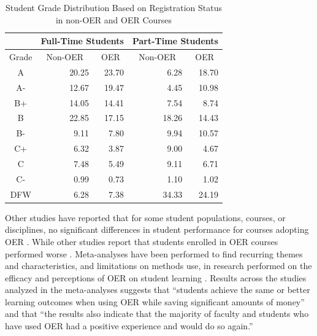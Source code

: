 \documentclass[11pt]{article}
\begin{document}
\begin{table}
\centering
\begin{tabular}{crrrr}
  & \multicolumn{2}{c}{Full-Time Students} & \multicolumn{2}{c}{Part-Time Students} \\ \hline
  \multicolumn{1}{c}{Grade} & \multicolumn{1}{c}{Non-OER} & \multicolumn{1}{c}{OER} & \multicolumn{1}{c}{Non-OER} & \multicolumn{1}{c}{OER}\\ \hline
  A\hspace{1.1ex} & 20.25 & 23.70 & 6.28 & 18.70 \\
  A-\hspace{0.7ex} & 12.67 & 19.47 & 4.45 & 10.98 \\
  B+ & 14.05 & 14.41 & 7.54 & 8.74 \\
  B\hspace{1.1ex} & 22.85 & 17.15 & 18.26 & 14.43 \\
  B-\hspace{0.7ex} & 9.11 & 7.80 & 9.94 & 10.57 \\
  C+ & 6.32 & 3.87 & 9.00 & 4.67 \\
  C\hspace{1.1ex} & 7.48 & 5.49 & 9.11 & 6.71 \\
  C-\hspace{0.8ex} & 0.99 & 0.73 & 1.10 & 1.02 \\
  DFW & 6.28 & 7.38 & 34.33 & 24.19 \\ \hline
\end{tabular}
\caption{Student Grade Distribution Based on Registration Status in non-OER and OER Courses \cite{CB-WC-PH:18}}
\label{tab:part-time-oer}
\end{table}

Other studies have reported that for some student populations, courses, or disciplines, no significant differences in student performance for courses adopting OER \cite{VC:18, YC-CC:17, RJ-FD-RL-KP:18, ML-OM-CT:08, CL-JL:18, WB-MC-KL:12, JH-DG:13, LF-JH:15, GA-AG-MM:15, OO-CH:17, TR:15, EC:17, CH-SR-GR:17, HR-CH-VM:18, JWS-JP:17}.  While other studies report that students enrolled in OER courses performed worse \cite{YC-CC:17, RG:17, TR:15}.  Meta-analyses have been performed to find recurring themes and characteristics, and limitations on methods use, in research performed on the efficacy and perceptions of OER on student learning \cite{hilton:16, hilton:22}.  Results across the studies analyzed in the meta-analyses \cite{hilton:16, hilton:22} suggests that ``students achieve the same or better learning outcomes when using OER while saving significant amounts of money'' and that ``the results also indicate that the majority of faculty and students who have used OER had a positive experience and would do so again.''
\end{document}
